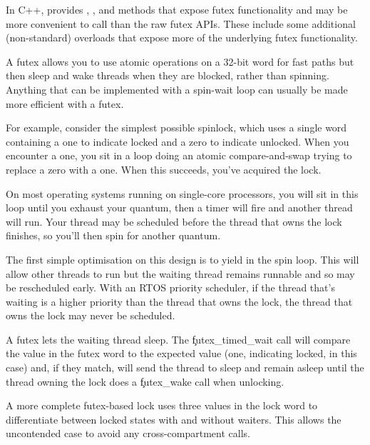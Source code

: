 

\begin{note}
	In C++,  provides , , and  methods that expose futex functionality and may be more convenient to call than the raw futex APIs.
	These include some additional (non-standard) overloads that expose more of the underlying futex functionality.
\end{note}

A futex allows you to use atomic operations on a 32-bit word for fast paths but then sleep and wake threads when they are blocked, rather than spinning.
Anything that can be implemented with a spin-wait loop can usually be made more efficient with a futex.

For example, consider the simplest possible spinlock, which uses a single word containing a one to indicate locked and a zero to indicate unlocked.
When you encounter a one, you sit in a loop doing an atomic compare-and-swap trying to replace a zero with a one.
When this succeeds, you've acquired the lock.

On most operating systems running on single-core processors, you will sit in this loop until you exhaust your quantum, then a timer will fire and another thread will run.
Your thread may be scheduled before the thread that owns the lock finishes, so you'll then spin for another quantum.

The first simple optimisation on this design is to yield in the spin loop.
This will allow other threads to run but the waiting thread remains runnable and so may be rescheduled early.
With an RTOS priority scheduler, if the thread that's waiting is a higher priority than the thread that owns the lock, the thread that owns the lock may never be scheduled.

A futex lets the waiting thread sleep.
The \c{futex_timed_wait} call will compare the value in the futex word to the expected value (one, indicating locked, in this case) and, if they match, will send the thread to sleep and remain asleep until the thread owning the lock does a \c{futex_wake} call when unlocking.

A more complete futex-based lock uses three values in the lock word to differentiate between locked states with and without waiters.
This allows the uncontended case to avoid any cross-compartment calls.

